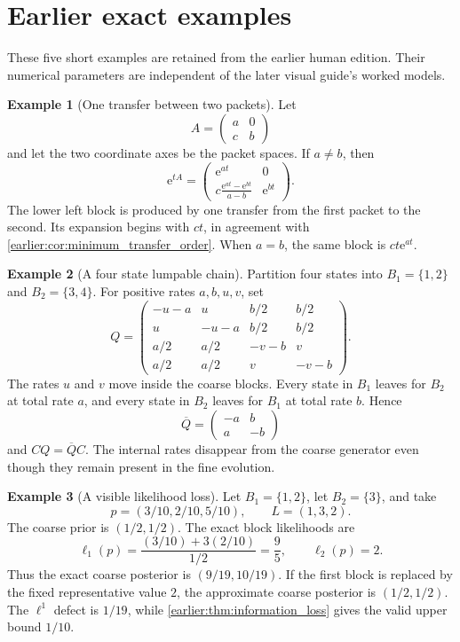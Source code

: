 \documentclass[11pt,letterpaper]{article}
\theoremstyle{plain}
\theoremstyle{plain}
\theoremstyle{plain}
\theoremstyle{definition}
\theoremstyle{definition}
\theoremstyle{definition}
\newtheorem{example}[example]{Example}
\theoremstyle{definition}
\theoremstyle{definition}
\theoremstyle{remark}
\theoremstyle{remark}
\theoremstyle{remark}
\theoremstyle{remark}
\theoremstyle{remark}
\theoremstyle{remark}
\newcommand{\e}{\mathrm e}
\let\KomorebiPrimitivemathrm\mathrm
\renewcommand{\mathrm}[1]{{\KomorebiPrimitivemathrm{#1}}}
\begin{document}
\section{Earlier exact examples}\label{earlier:section:06}
These five short examples are retained from the earlier human edition. Their numerical parameters are independent of the later visual guide's worked models.
\begin{example}[One transfer between two packets]\label{earlier:record:026}\label{earlier:ex:two_packet_transfer}
Let
\[
A=
\begin{pmatrix}
a&0\\
c&b
\end{pmatrix}
\]
and let the two coordinate axes be the packet spaces. If \(a\neq b\), then
\[
\e^{tA}
=
\begin{pmatrix}
\e^{at}&0\\
\displaystyle c\frac{\e^{at}-\e^{bt}}{a-b}&\e^{bt}
\end{pmatrix}.
\]
The lower left block is produced by one transfer from the first packet to the second. Its expansion begins with \(ct\), in agreement with \cref{earlier:cor:minimum_transfer_order}. When \(a=b\), the same block is \(ct\e^{at}\).
\end{example}

\begin{example}[A four state lumpable chain]\label{earlier:record:027}\label{earlier:ex:four_state_lumping}
Partition four states into \(B_1=\{1,2\}\) and \(B_2=\{3,4\}\). For positive rates \(a,b,u,v\), set
\[
Q=
\begin{pmatrix}
-u-a&u&b/2&b/2\\
u&-u-a&b/2&b/2\\
a/2&a/2&-v-b&v\\
a/2&a/2&v&-v-b
\end{pmatrix}.
\]
The rates \(u\) and \(v\) move inside the coarse blocks. Every state in \(B_1\) leaves for \(B_2\) at total rate \(a\), and every state in \(B_2\) leaves for \(B_1\) at total rate \(b\). Hence
\[
\overline Q=
\begin{pmatrix}
-a&b\\
a&-b
\end{pmatrix}
\]
and \(CQ=\overline QC\). The internal rates disappear from the coarse generator even though they remain present in the fine evolution.
\end{example}

\begin{example}[A visible likelihood loss]\label{earlier:record:028}\label{earlier:ex:bayes_information_loss}
Let \(B_1=\{1,2\}\), let \(B_2=\{3\}\), and take
\[
p=(3/10,2/10,5/10),
\qquad
L=(1,3,2).
\]
The coarse prior is \((1/2,1/2)\). The exact block likelihoods are
\[
\ell_1(p)=\frac{(3/10)+3(2/10)}{1/2}=\frac95,
\qquad
\ell_2(p)=2.
\]
Thus the exact coarse posterior is \((9/19,10/19)\). If the first block is replaced by the fixed representative value \(2\), the approximate coarse posterior is \((1/2,1/2)\). The \(\ell^1\) defect is \(1/19\), while \cref{earlier:thm:information_loss} gives the valid upper bound \(1/10\).
\end{example}
\end{document}
